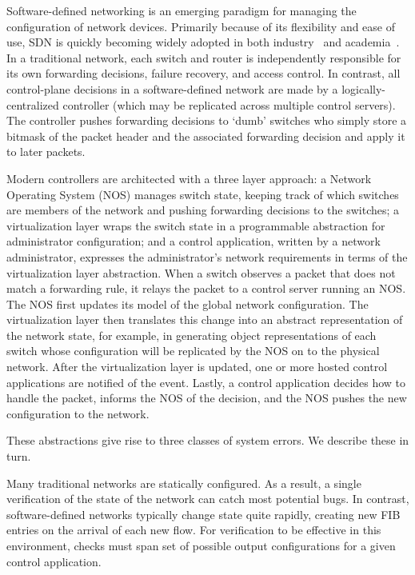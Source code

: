 Software-defined networking is an emerging paradigm for managing the
configuration of network devices. Primarily because of its flexibility and ease of use, SDN is
quickly becoming widely adopted in both industry~\cite{bigswitch, nicirahomepage} and academia~\cite{nox, pox, ethane}. 
In a traditional network, each switch and router is independently responsible for
its own forwarding decisions, failure recovery, and access control. In
contrast, all control-plane decisions in a software-defined network are made by
a logically-centralized controller (which may be replicated across multiple control servers). 
The controller pushes forwarding decisions to `dumb' 
switches who simply store a bitmask of the packet header and the associated forwarding decision and apply it 
to later packets. 


Modern controllers are architected with a three layer approach: a Network Operating System (NOS) manages switch state, keeping track of which switches are members of the network and pushing forwarding decisions to the switches; a virtualization layer wraps the switch state in a programmable abstraction for administrator configuration; and a control application, written by a network administrator, expresses the administrator's network requirements in terms of the virtualization layer abstraction.
 When a
switch observes a packet that does not match a forwarding rule, 
it relays the packet to a control server running an NOS. 
The NOS first updates its model of the global network configuration.
The virtualization layer then translates this change into an abstract 
representation of the network state, for example, in generating object representations of each switch whose configuration will be replicated by the NOS on to the physical network. After the virtualization layer is updated, one or more hosted control
applications are notified of the event. Lastly, a
control application decides how to handle the packet, informs the NOS of the decision,
and the NOS pushes the new configuration to the network.

These abstractions give rise to three classes of system errors. We describe these in turn.

 Many traditional networks are statically configured.
As a result, a single verification of the state of the network can catch most potential bugs. 
In contrast, software-defined networks typically change state quite rapidly, creating new FIB entries on the arrival of each new flow.  For verification to be
effective in this environment, checks must span set of possible output configurations for a given control
application.

